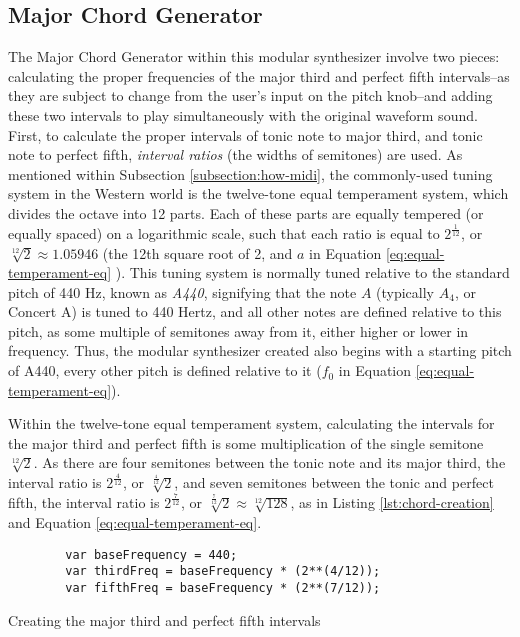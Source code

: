 \subsection{Major Chord Generator}

The Major Chord Generator within this modular synthesizer involve two pieces: calculating the proper frequencies of the major third and perfect fifth intervals--as they are subject to change from the user's input on the pitch knob--and adding these two intervals to play simultaneously with the original waveform sound. First, to calculate the proper intervals of tonic note to major third, and tonic note to perfect fifth, \textit{interval ratios} (the widths of semitones) are used. As mentioned within Subsection \ref{subsection:how-midi}, the commonly-used tuning system in the Western world is the twelve-tone equal temperament system, which divides the octave into 12 parts. Each of these parts are equally tempered (or equally spaced) on a logarithmic scale, such that each ratio is equal to $2^\frac{1}{12}$, or $\sqrt[12]{2} \approx 1.05946$ (the 12th square root of 2, and $a$ in Equation \ref{eq:equal-temperament-eq} \cite{Suits_1998}). This tuning system is normally tuned relative to the standard pitch of 440 Hz, known as \textit{A440}, signifying that the note $A$ (typically $A_4$, or Concert A) is tuned to 440 Hertz, and all other notes are defined relative to this pitch, as some multiple of semitones away from it, either higher or lower in frequency. Thus,  the modular synthesizer created also begins with a starting pitch of A440, every other pitch is defined relative to it ($f_0$ in Equation \ref{eq:equal-temperament-eq}).

Within the twelve-tone equal temperament system, calculating the intervals for the major third and perfect fifth is some multiplication of the single semitone $\sqrt[12]{2}$. As there are four semitones between the tonic note and its major third, the interval ratio is $2^\frac{4}{12}$, or $\sqrt[\frac{4}{12}]{2}$, and seven semitones between the tonic and perfect fifth, the interval ratio is $2^\frac{7}{12}$, or $\sqrt[\frac{7}{12}]{2} \approx \sqrt[12]{128}$, as in Listing \ref{lst:chord-creation} and Equation \ref{eq:equal-temperament-eq}. 

\begin{listing}
	\begin{lstlisting}
		var baseFrequency = 440;
		var thirdFreq = baseFrequency * (2**(4/12));
		var fifthFreq = baseFrequency * (2**(7/12));
	\end{lstlisting}
	\label{lst:chord-creation}
	\caption{Creating the major third and perfect fifth intervals}
\end{listing}

